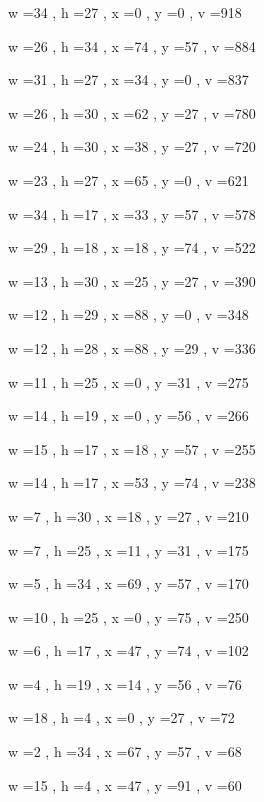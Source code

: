 \documentclass[11pt]{article}
\begin{document}
w =34 , h =27 , x =0 , y =0 , v =918
\par
w =26 , h =34 , x =74 , y =57 , v =884
\par
w =31 , h =27 , x =34 , y =0 , v =837
\par
w =26 , h =30 , x =62 , y =27 , v =780
\par
w =24 , h =30 , x =38 , y =27 , v =720
\par
w =23 , h =27 , x =65 , y =0 , v =621
\par
w =34 , h =17 , x =33 , y =57 , v =578
\par
w =29 , h =18 , x =18 , y =74 , v =522
\par
w =13 , h =30 , x =25 , y =27 , v =390
\par
w =12 , h =29 , x =88 , y =0 , v =348
\par
w =12 , h =28 , x =88 , y =29 , v =336
\par
w =11 , h =25 , x =0 , y =31 , v =275
\par
w =14 , h =19 , x =0 , y =56 , v =266
\par
w =15 , h =17 , x =18 , y =57 , v =255
\par
w =14 , h =17 , x =53 , y =74 , v =238
\par
w =7 , h =30 , x =18 , y =27 , v =210
\par
w =7 , h =25 , x =11 , y =31 , v =175
\par
w =5 , h =34 , x =69 , y =57 , v =170
\par
w =10 , h =25 , x =0 , y =75 , v =250
\par
w =6 , h =17 , x =47 , y =74 , v =102
\par
w =4 , h =19 , x =14 , y =56 , v =76
\par
w =18 , h =4 , x =0 , y =27 , v =72
\par
w =2 , h =34 , x =67 , y =57 , v =68
\par
w =15 , h =4 , x =47 , y =91 , v =60
\par
\newpage
\end{document}
